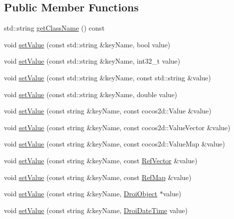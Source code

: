 \subsection*{Public Member Functions}
\begin{DoxyCompactItemize}
\item 
std\+::string \hyperlink{class_droi_object_af6e4a33f554662af5513349036b986b4}{get\+Class\+Name} () const
\item 
void \hyperlink{class_droi_object_a01fa14894085c5c83c86044c2506ca54}{set\+Value} (const std\+::string \&key\+Name, bool value)
\item 
void \hyperlink{class_droi_object_ab3ae056f106db7858aae570827ac58a9}{set\+Value} (const std\+::string \&key\+Name, int32\+\_\+t value)
\item 
void \hyperlink{class_droi_object_a6cdc5a7db3146a6d1ee9b3ceb6d1dfb4}{set\+Value} (const std\+::string \&key\+Name, const std\+::string \&value)
\item 
void \hyperlink{class_droi_object_adf2252384ee3ab34c61b622eab4b982c}{set\+Value} (const std\+::string \&key\+Name, double value)
\item 
void \hyperlink{class_droi_object_ab8db04deada87fb168a028299bf681f8}{set\+Value} (const string \&key\+Name, const cocos2d\+::\+Value \&value)
\item 
void \hyperlink{class_droi_object_a15dfff792290ec97db60876d66289147}{set\+Value} (const string \&key\+Name, const cocos2d\+::\+Value\+Vector \&value)
\item 
void \hyperlink{class_droi_object_ad4bda48ac7796b5ad5fa1d1967e71e5a}{set\+Value} (const string \&key\+Name, const cocos2d\+::\+Value\+Map \&value)
\item 
void \hyperlink{class_droi_object_ae90ad170db569ac77b92b737f5006c80}{set\+Value} (const string \&key\+Name, const \hyperlink{class_ref_vector}{Ref\+Vector} \&value)
\item 
void \hyperlink{class_droi_object_a9f08b9842d8e1c6e0917ab7e9e307fb7}{set\+Value} (const string \&key\+Name, const \hyperlink{class_ref_map}{Ref\+Map} \&value)
\item 
void \hyperlink{class_droi_object_a2401d9db2e15cedb2494e027c9faf6c7}{set\+Value} (const string \&key\+Name, \hyperlink{class_droi_object}{Droi\+Object} $\ast$value)
\item 
void \hyperlink{class_droi_object_af2c5b74a3896d0feaddc64b4fdf003c2}{set\+Value} (const string \&key\+Name, \hyperlink{class_droi_date_time}{Droi\+Date\+Time} value)
\item 

\end{DoxyCompactItemize}

